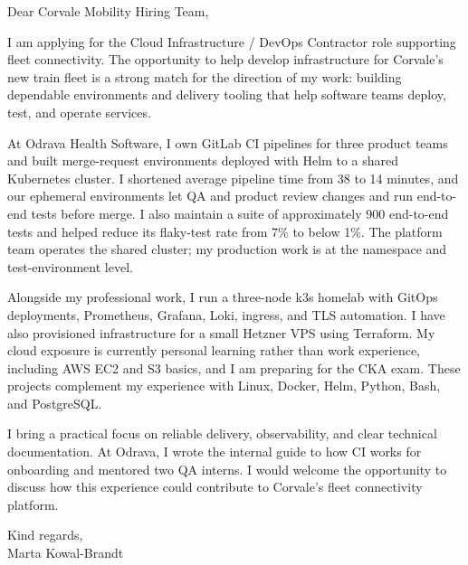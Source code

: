 \documentclass[11pt,a4paper]{article}
\begin{document}
Dear Corvale Mobility Hiring Team,

I am applying for the Cloud Infrastructure / DevOps Contractor role supporting fleet connectivity. The opportunity to help develop infrastructure for Corvale's new train fleet is a strong match for the direction of my work: building dependable environments and delivery tooling that help software teams deploy, test, and operate services.

At Odrava Health Software, I own GitLab CI pipelines for three product teams and built merge-request environments deployed with Helm to a shared Kubernetes cluster. I shortened average pipeline time from 38 to 14 minutes, and our ephemeral environments let QA and product review changes and run end-to-end tests before merge. I also maintain a suite of approximately 900 end-to-end tests and helped reduce its flaky-test rate from 7\% to below 1\%. The platform team operates the shared cluster; my production work is at the namespace and test-environment level.

Alongside my professional work, I run a three-node k3s homelab with GitOps deployments, Prometheus, Grafana, Loki, ingress, and TLS automation. I have also provisioned infrastructure for a small Hetzner VPS using Terraform. My cloud exposure is currently personal learning rather than work experience, including AWS EC2 and S3 basics, and I am preparing for the CKA exam. These projects complement my experience with Linux, Docker, Helm, Python, Bash, and PostgreSQL.

I bring a practical focus on reliable delivery, observability, and clear technical documentation. At Odrava, I wrote the internal guide to how CI works for onboarding and mentored two QA interns. I would welcome the opportunity to discuss how this experience could contribute to Corvale's fleet connectivity platform.

Kind regards,\\
Marta Kowal-Brandt
\end{document}

